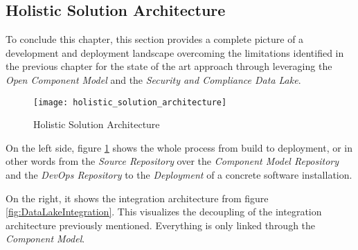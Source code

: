 \subsection{Holistic Solution Architecture}
To conclude this chapter, this section provides a complete picture of a development and deployment landscape overcoming the limitations identified in the previous chapter for the state of the art approach through leveraging the \emph{Open Component Model} and the \emph{Security and Compliance Data Lake}.

\begin{figure}[H]
	\centering
	\texttt{[image: holistic\_solution\_architecture]}
	\caption[Holistic Solution Architecture]{Holistic Solution Architecture }
	\label{fig:HolisticSolutionArchitecture}
\end{figure}

On the left side, figure \ref{fig:HolisticSolutionArchitecture} shows the whole process from build to deployment, or in other words from the \emph{Source Repository} over the \emph{Component Model Repository} and the \emph{DevOps Repository} to the \emph{Deployment} of a concrete software installation.\par
On the right, it shows the integration architecture from figure \ref{fig:DataLakeIntegration}. This visualizes the decoupling of the integration architecture previously mentioned. Everything is only linked through the \emph{Component Model}.\\


